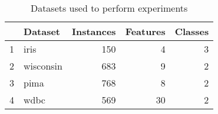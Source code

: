 \begin{table}
\footnotesize
\caption{Datasets used to perform experiments}
\label{tab:datasets}
\begin{tabular}{llrrr}
\hline
 & Dataset & Instances & Features & Classes \\
\hline
1 & iris & 150 & 4 & 3 \\
2 & wisconsin & 683 & 9 & 2 \\
3 & pima & 768 & 8 & 2 \\
4 & wdbc & 569 & 30 & 2 \\
\hline
\end{tabular}
\end{table}
